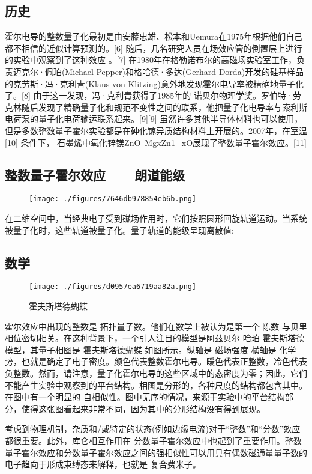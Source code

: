 \subsection{历史}
霍尔电导的整数量子化最初是由安藤忠雄、松本和Uemura在1975年根据他们自己都不相信的近似计算预测的。[6] 随后，几名研究人员在场效应管的倒置层上进行的实验中观察到了这种效应 。[7] 在1980年在格勒诺布尔的高磁场实验室工作，负责迈克尔·佩珀(Michael Pepper)和格哈德·多达(Gerhard Dorda)开发的硅基样品的克劳斯·冯·克利青(Klaus von Klitzing)意外地发现霍尔电导率被精确地量子化了。[8] 由于这一发现，冯·克利青获得了1985年的 诺贝尔物理学奖。罗伯特·劳克林随后发现了精确量子化和规范不变性之间的联系，他把量子化电导率与索利斯电荷泵的量子化电荷输运联系起来。[9][9] 虽然许多其他半导体材料也可以使用，但是多数整数量子霍尔实验都是在砷化镓异质结构材料上开展的。2007年，在室温[10] 条件下， 石墨烯中氧化锌镁ZnO–MgxZn1−xO展现了整数量子霍尔效应。[11]

\subsection{整数量子霍尔效应——朗道能级}
\begin{figure}[ht]
\centering
\texttt{[image: ./figures/7646db978854eb6b.png]}
\caption\label{fig_LZHRXY_1}
\end{figure}
在二维空间中，当经典电子受到磁场作用时，它们按照圆形回旋轨道运动。当系统被量子化时，这些轨道被量子化。量子轨道的能级呈现离散值:

\subsection{数学}
\begin{figure}[ht]
\centering
\texttt{[image: ./figures/d0957ea6719aa82a.png]}
\caption{霍夫斯塔德蝴蝶} \label{fig_LZHRXY_2}
\end{figure}
霍尔效应中出现的整数是 拓扑量子数。他们在数学上被认为是第一个 陈数 与贝里相位密切相关。在这种背景下，一个引人注目的模型是阿兹贝尔-哈珀-霍夫斯塔德模型，其量子相图是 霍夫斯塔德蝴蝶 如图所示。纵轴是 磁场强度 横轴是 化学势，也就是确定了电子密度。颜色代表整数霍尔电导。暖色代表正整数，冷色代表负整数。然而，请注意，量子化霍尔电导的这些区域中的态密度为零；因此，它们不能产生实验中观察到的平台结构。相图是分形的，各种尺度的结构都包含其中。在图中有一个明显的 自相似性。图中无序的情况，来源于实验中的平台结构部分，使得这张图看起来非常不同，因为其中的分形结构没有得到展现。

考虑到物理机制，杂质和/或特定的状态(例如边缘电流)对于“整数”和“分数”效应都很重要。此外，库仑相互作用在 分数量子霍尔效应中也起到了重要作用。整数量子霍尔效应和分数量子霍尔效应之间的强相似性可以用具有偶数磁通量量子数的电子趋向于形成束缚态来解释，也就是 复合费米子。

